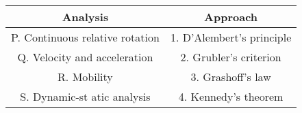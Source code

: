      
\begin{tabular}{|c|c|}                                      \hline \textbf{Analysis} & \textbf{Approach} \\ \hline P. Continuous relative rotation &
     1. D'Alembert's principle \\ \hline Q. Velocity and
     acceleration & 2. Grubler's criterion \\ \hline R.
    Mobility & 3. Grashoff's law \\ \hline S. Dynamic-st
    atic analysis & 4. Kennedy's theorem \\ \hline
\end{tabular}
